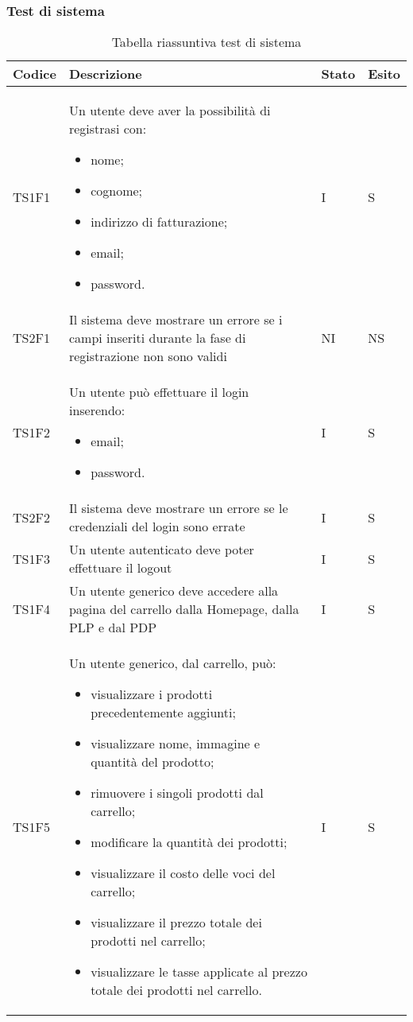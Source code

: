 \subsubsection{Test di sistema}
{

\centering
\renewcommand{\arraystretch}{2}
\begin{longtable}{C{2cm} C{9.6cm} C{1.5cm} C{1cm}}
\caption{Tabella riassuntiva test di sistema}\\
\textbf{Codice} &
\textbf{Descrizione}&
\textbf{Stato}&
\textbf{Esito}\\
\endhead


TS1F1 & Un utente deve aver la possibilità di registrasi con:
\begin{itemize}
	\item nome;
	\item cognome;
	\item indirizzo di fatturazione;
	\item email;
	\item password.
\end{itemize} & I & S\\
TS2F1 & Il sistema deve mostrare un errore se
i campi inseriti durante la fase di registrazione non sono validi & NI & NS\\
TS1F2 & Un utente può effettuare il login inserendo:
\begin{itemize}
	\item email;
	\item password.
\end{itemize} & I & S\\
TS2F2 & Il sistema deve mostrare un errore se le credenziali del login sono errate & I & S\\
TS1F3 & Un utente autenticato deve poter effettuare il
logout & I & S\\
TS1F4 & Un utente generico deve accedere alla pagina del carrello dalla Homepage, dalla PLP e dal PDP & I & S\\
TS1F5 & Un utente generico, dal carrello, può:
\begin{itemize}
	\item visualizzare i prodotti precedentemente aggiunti;
	\item visualizzare nome, immagine e quantità del prodotto;
	\item rimuovere i singoli prodotti dal carrello;
	\item modificare la quantità dei prodotti;
	\item visualizzare il costo delle voci del carrello;
	\item visualizzare il prezzo totale dei prodotti nel carrello;
	\item visualizzare le tasse applicate al prezzo totale dei prodotti nel carrello.
\end{itemize}
& I & S\\


\end{longtable}}
